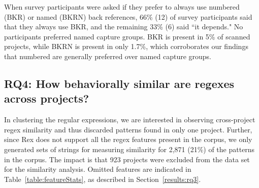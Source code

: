When survey participants were asked if they prefer to always use numbered (BKR) or named (BKRN) back references, 66\% (12) of survey participants said that they always use BKR, and the remaining 33\% (6) said ``it depends."  No participants preferred named capture groups.  BKR is present in 5\% of scanned projects, while BKRN is present in only 1.7\%, which corroborates our findings that numbered  are generally preferred over named capture groups.

\subsection{RQ4: How behaviorally similar are regexes across projects?}
\label{rq4:results}


In clustering the regular expressions, we are interested in observing cross-project regex similarity and thus discarded patterns found in only one project.
Further, since Rex does not support all the regex features present in the corpus, we only generated sets of strings for measuring similarity for 2,871 (21\%) of the  patterns in the corpus. The impact is that 923 projects were excluded from the data set for the similarity analysis. Omitted features are indicated in Table~\ref{table:featureStats}, as described in Section~\ref{results:rq3}.




